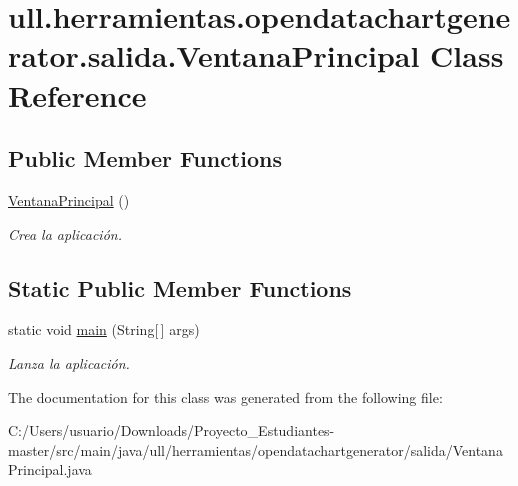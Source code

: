 \hypertarget{classull_1_1herramientas_1_1opendatachartgenerator_1_1salida_1_1_ventana_principal}{}\section{ull.\+herramientas.\+opendatachartgenerator.\+salida.\+Ventana\+Principal Class Reference}
\label{classull_1_1herramientas_1_1opendatachartgenerator_1_1salida_1_1_ventana_principal}
\subsection*{Public Member Functions}
\begin{DoxyCompactItemize}
\item 
\mbox{\label{classull_1_1herramientas_1_1opendatachartgenerator_1_1salida_1_1_ventana_principal_a3a6795cd16db9c8871e7f6512bdfa042}} 
\mbox{\hyperlink{classull_1_1herramientas_1_1opendatachartgenerator_1_1salida_1_1_ventana_principal_a3a6795cd16db9c8871e7f6512bdfa042}{Ventana\+Principal}} ()
\begin{DoxyCompactList}\small\item\em Crea la aplicación. \end{DoxyCompactList}\end{DoxyCompactItemize}
\subsection*{Static Public Member Functions}
\begin{DoxyCompactItemize}
\item 
\mbox{\label{classull_1_1herramientas_1_1opendatachartgenerator_1_1salida_1_1_ventana_principal_ae5c39ff51745b08ce1d51121c8342e4e}} 
static void \mbox{\hyperlink{classull_1_1herramientas_1_1opendatachartgenerator_1_1salida_1_1_ventana_principal_ae5c39ff51745b08ce1d51121c8342e4e}{main}} (String\mbox{[}$\,$\mbox{]} args)
\begin{DoxyCompactList}\small\item\em Lanza la aplicación. \end{DoxyCompactList}\end{DoxyCompactItemize}


The documentation for this class was generated from the following file\+:\begin{DoxyCompactItemize}
\item 
C\+:/\+Users/usuario/\+Downloads/\+Proyecto\+\_\+\+Estudiantes-\/master/src/main/java/ull/herramientas/opendatachartgenerator/salida/Ventana\+Principal.\+java\end{DoxyCompactItemize}
